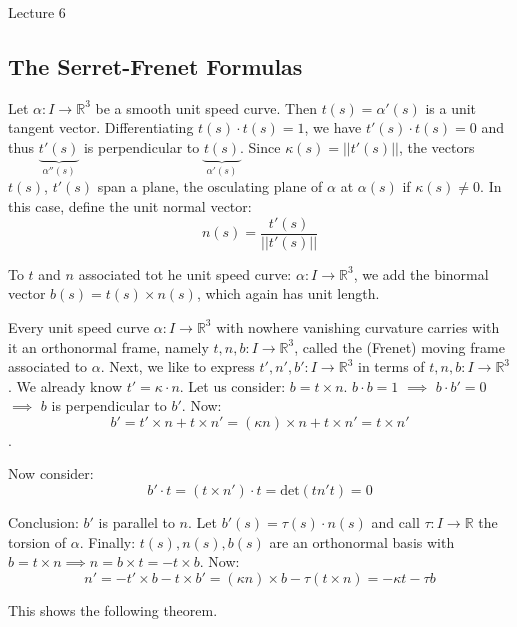 \begin{center}

Lecture 6

\end{center}

\subsection{The Serret-Frenet Formulas}

Let $\alpha : I \rightarrow \mathbb{R}^3$ be a smooth unit speed curve. Then $t(s) = \alpha'(s)$ is a unit tangent vector. Differentiating $t(s) \cdot t(s) = 1$, we have $t'(s) \cdot t(s) = 0$ and thus $\underbrace{t'(s)}_{\alpha''(s)}$ is perpendicular to $\underbrace{t(s)}_{\alpha'(s)}$. Since $\kappa(s) = ||t'(s)||$, the vectors $t(s)$, $t'(s)$ span a plane, the osculating plane of $\alpha$ at $\alpha(s)$  if $\kappa(s) \neq 0$. In this case, define the unit normal vector: $$n(s) = \frac{t'(s)}{||t'(s)||}$$

To $t$ and $n$ associated tot he unit speed curve: $\alpha: I \rightarrow \mathbb{R}^3$, we add the binormal vector $b(s) = t(s) \times n(s)$, which again has unit length.

Every unit speed curve $\alpha : I \rightarrow \mathbb{R}^3$ with nowhere vanishing curvature carries with it an orthonormal frame, namely $t,n,b : I \rightarrow \mathbb{R}^3$, called the (Frenet) moving frame associated to $\alpha$. Next, we like to express $t',n',b': I \rightarrow \mathbb{R}^3$ in terms of $t,n,b : I \rightarrow \mathbb{R}^3$. We already know $t' = \kappa \cdot n$. Let us consider: $b = t \times n$. $b \cdot b = 1$ $\implies$ $b \cdot b' = 0$ $\implies$ $b$ is perpendicular to $b'$. Now: $$b' = t' \times n + t \times n' = (\kappa n) \times n + t \times n' = t \times n'$$.

Now consider: $$b' \cdot t = (t \times n') \cdot t = \text{det} (t n' t) = 0$$

Conclusion: $b'$ is parallel to $n$. Let $b'(s) = \tau (s) \cdot n(s)$ and call $\tau : I \rightarrow \mathbb{R}$ the torsion of $\alpha$. Finally: $t(s), n(s), b(s)$ are an orthonormal basis with $b = t \times n \implies n = b \times t = - t \times b$. Now: $$n' = - t' \times b - t \times b' = (\kappa n) \times b - \tau(t\times n) = -\kappa t - \tau b$$

This shows the following theorem.

\vspace{\baselineskip}


